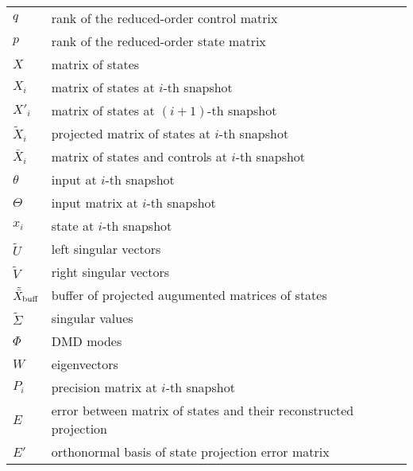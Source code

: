\begin{table}[H]
\begin{tabular}{p{2cm}l}
		\(q\)                          & rank of the reduced-order control matrix                          \\
		\(p\)                          & rank of the reduced-order state matrix                            \\
		\(X\)                          & matrix of states                                                  \\
		\(X_i\)                        & matrix of states at \(i\)-th snapshot                             \\
		\(X'_i\)                       & matrix of states at \((i+1)\)-th snapshot                         \\
		\(\tilde{X}_i\)                & projected matrix of states at \(i\)-th snapshot                   \\
		\(\bar{X}_i\)                  & matrix of states and controls at \(i\)-th snapshot                \\
		\(\theta \)                    & input at \(i\)-th snapshot                                        \\
		\(\Theta \)                    & input matrix at \(i\)-th snapshot                                 \\
		\(x_i\)                        & state at \(i\)-th snapshot                                        \\
		\(\tilde{U}\)                  & left singular vectors                                             \\
		\(\tilde{V}\)                  & right singular vectors                                            \\
		\(\tilde{\bar{X}} _{\text{buff}}\) & buffer of projected augumented matrices of states                 \\
		\(\tilde{\Sigma} \)            & singular values                                                   \\
		\(\Phi \)                      & DMD modes                                                         \\
		\( W \)                        & eigenvectors                                                      \\
		\(P_i\)                        & precision matrix at \(i\)-th snapshot                             \\
		\(E\)                          & error between matrix of states and their reconstructed projection \\
		\(E'\)                         & orthonormal basis of state projection error matrix                \\

\end{tabular}
\end{table}
